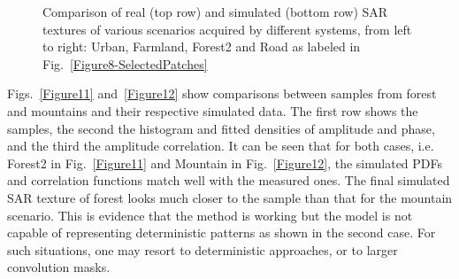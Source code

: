 \documentclass[journal]{IEEEtran}
\begin{document}
\begin{figure*}[hbt]
\centering
\begin{subfigure}[t]{4 cm}
	\centering
\end{subfigure}
\quad
\begin{subfigure}[t]{4 cm}
	\centering
\end{subfigure}
\quad
\begin{subfigure}[t]{4 cm}
	\centering
\end{subfigure}
\quad
\begin{subfigure}[t]{4 cm}
	\centering
\end{subfigure}
\quad
\begin{subfigure}[t]{4 cm}
	\centering
\end{subfigure}
\quad
\begin{subfigure}[t]{4 cm}
	\centering
\end{subfigure}
\quad
\begin{subfigure}[t]{4 cm}
	\centering
\end{subfigure}
\quad
\begin{subfigure}[t]{4 cm}
	\centering
\end{subfigure}
\caption{Comparison of real (top row) and simulated (bottom row) SAR textures of various scenarios acquired by different systems, from left to right: Urban, Farmland, Forest2 and Road as labeled in Fig.~\ref{Figure8-SelectedPatches}}\label{Figure10}
\end{figure*}

Figs.~\ref{Figure11} and~\ref{Figure12} show comparisons between samples from forest and mountains and their respective simulated data.
The first row shows the samples,
the second the histogram and fitted densities of amplitude and phase,
and the third the amplitude correlation.
It can be seen that for both cases, i.e. Forest2 in Fig.~\ref{Figure11} and Mountain in Fig.~\ref{Figure12}, the simulated PDFs and correlation functions match well with the measured ones.
The final simulated SAR texture of forest looks much closer to the sample than that for the mountain scenario.
This is evidence that the method is working but the model is not capable of representing deterministic patterns as shown in the second case.
For such situations, one may resort to deterministic approaches, or to larger convolution masks.
\end{document}

